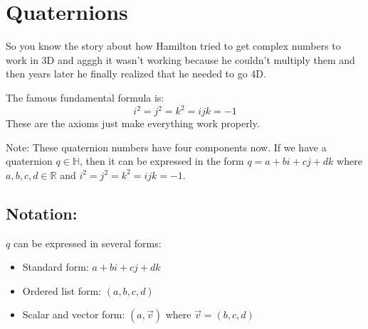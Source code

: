 \documentclass[12pt]{article}
\begin{document}
	\iffalse
	
	\subsection{Iterated Rotation}
	
	If we want motion to be all smooth and stuff, then $\theta$ will probably be very small. 
	For example, if we want a square to rotate very smoothly around the origin in an animation, we would choose an $r$ that's very close to 1, and then multiply it to each vertex of the square. 
	And again. 
	And again. 
	And once for each frame of the animation. 
	So the rotor $r$ would be locked in place, always pointing to that same complex number just slightly removed from 1, while the square smoothly rotates about the origin, moving around and around.
	
	\fi

	\section{Quaternions}
	
	So you know the story about how Hamilton tried to get complex numbers to work in 3D and agggh it wasn't working because he couldn't multiply them and then years later he finally realized that he needed to go 4D.
	
	\iffalse
		``Marty! You're not thinking fourth dimensionally!'' -- E. L. Brown
	\fi

	The famous fundamental formula is:
		$$ i^2 = j^2 = k^2 = ijk = -1 $$
	These are the axioms just make everything work properly.
	
	Note: These quaternion numbers have four components now. 
	If we have a quaternion $q \in \mathbb{H}$, then it can be expressed in the form $q = a + bi + cj + dk$ where $a,b,c,d \in \mathbb{R}$ and $i^2=j^2=k^2=ijk=-1$.
	
	\subsection{Notation:}
	
	$q$ can be expressed in several forms:
	\begin{itemize}
		\item Standard form: $a + bi + cj + dk$
		\item Ordered list form: $(a, b, c, d)$
		\item Scalar and vector form: $(a, \vec{v})$ where $\vec{v} = (b, c, d)$
	\end{itemize}
\end{document}
